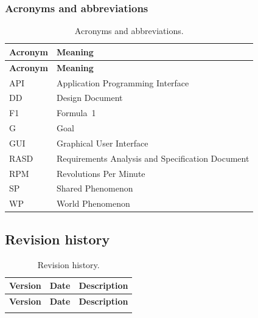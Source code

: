 \documentclass[11pt,a4paper]{article}
\begin{document}
\subsubsection{Acronyms and abbreviations}
\begin{longtable}{@{}L{3.6cm} L{11.1cm}@{}}
\caption{Acronyms and abbreviations.}\label{tab:acr}\\
\toprule \textbf{Acronym} & \textbf{Meaning}\\ \midrule \endfirsthead
\toprule \textbf{Acronym} & \textbf{Meaning}\\ \midrule \endhead
\bottomrule \endfoot
API & Application Programming Interface\\
DD & Design Document\\
F1 & Formula~1\\
G & Goal\\
GUI & Graphical User Interface\\
RASD & Requirements Analysis and Specification Document\\
RPM & Revolutions Per Minute\\
SP & Shared Phenomenon\\
WP & World Phenomenon\\
\end{longtable}
 
\subsection{Revision history}
\begin{longtable}{@{}L{2cm} L{3.2cm} L{9.5cm}@{}}
\caption{Revision history.}\label{tab:rev}\\
\toprule \textbf{Version} & \textbf{Date} & \textbf{Description}\\ \midrule \endfirsthead
\toprule \textbf{Version} & \textbf{Date} & \textbf{Description}\\ \midrule \endhead
\bottomrule \endfoot
&&\\
\end{longtable}
 
\end{document}
